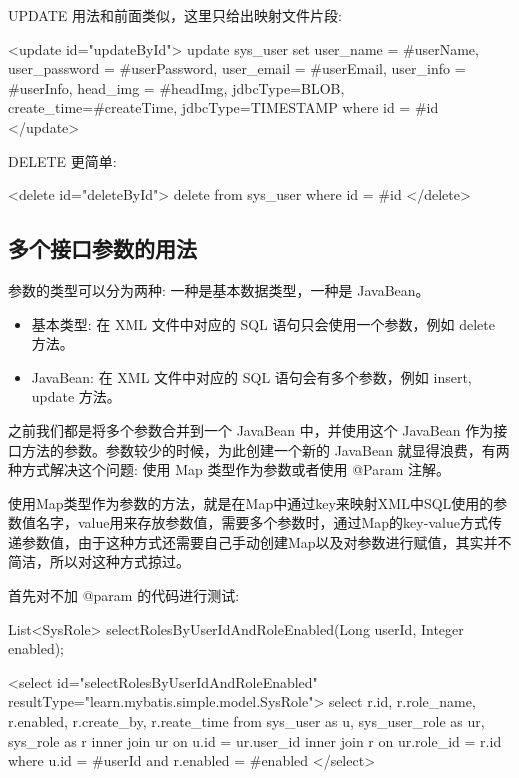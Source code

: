 UPDATE 用法和前面类似，这里只给出映射文件片段:

\begin{xml}
<update id="updateById">
    update sys_user
    set user_name     = #{userName},
        user_password = #{userPassword},
        user_email    = #{userEmail},
        user_info     = #{userInfo},
        head_img      = #{headImg, jdbcType=BLOB},
        create_time=#{createTime, jdbcType=TIMESTAMP}
    where id = #{id}
</update>
\end{xml}

DELETE 更简单:

\begin{xml}
<delete id="deleteById">
    delete from sys_user where id = #{id}
</delete>
\end{xml}

\subsection{多个接口参数的用法}

参数的类型可以分为两种: 一种是基本数据类型，一种是 JavaBean。
\begin{itemize}
    \item 基本类型: 在 XML 文件中对应的 SQL 语句只会使用一个参数，例如 delete 方法。
    \item JavaBean: 在 XML 文件中对应的 SQL 语句会有多个参数，例如 insert, update 方法。
\end{itemize}

之前我们都是将多个参数合并到一个 JavaBean 中，并使用这个 JavaBean 作为接口方法的参数。参数较少的时候，为此创建一个新的 JavaBean 就显得浪费，有两种方式解决这个问题: 使用 Map 类型作为参数或者使用 @Param 注解。

使用Map类型作为参数的方法，就是在Map中通过key来映射XML中SQL使用的参数值名字，value用来存放参数值，需要多个参数时，通过Map的key-value方式传递参数值，由于这种方式还需要自己手动创建Map以及对参数进行赋值，其实并不简洁，所以对这种方式掠过。

首先对不加 @param 的代码进行测试:

\begin{Java}
List<SysRole> selectRolesByUserIdAndRoleEnabled(Long userId, Integer enabled);
\end{Java}

\begin{xml}
<select id="selectRolesByUserIdAndRoleEnabled" resultType="learn.mybatis.simple.model.SysRole">
    select r.id, r.role_name, r.enabled, r.create_by, r.reate_time
    from sys_user as u,
        sys_user_role as ur,
        sys_role as r
             inner join ur on u.id = ur.user_id
             inner join r on ur.role_id = r.id
    where u.id = #{userId}
        and r.enabled = #{enabled}
</select>
\end{xml}

